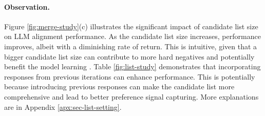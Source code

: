 \paragraph{Observation.}
Figure \ref{fig:merge-study}(c) illustrates the significant impact of candidate list size on LLM alignment performance.
As the candidate list size increases, performance improves, albeit with a diminishing rate of return. 
This is intuitive, given that a bigger candidate list size can contribute to more hard negatives and potentially benefit the model learning \citep{qu2020rocketqa}.
Table \ref{fig:list-study} demonstrates that incorporating responses from previous iterations can enhance performance.
This is potentially because introducing previous responses can make the candidate list more comprehensive and lead to better preference signal capturing.
More explanations are in Appendix \ref{apx:sec-list-setting}.



